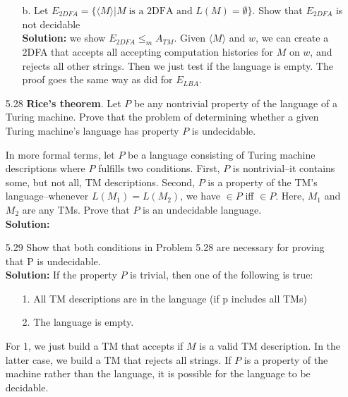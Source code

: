 \begin{enumerate}
\begin{enumerate}
\item[b.]Let $E_{2DFA} = \{\langle M \rangle\vert M\;\text{is a 2DFA and $L(M) = \emptyset$}\}$. Show that $E_{2DFA}$ is not decidable
\\
\textbf{Solution:} we show $E_{2DFA} \le_m A_{TM}$. Given $\langle M \rangle$ and $w$, we can create a 2DFA that accepts all accepting computation histories for $M$ on $w$, and rejects all other strings. Then we just test if the language is empty. The proof goes the same way as did for $E_{LBA}$.
\end{enumerate}

\item[5.28]\textbf{Rice's theorem}. Let $P$ be any nontrivial property of the language of a Turing machine. Prove that the problem of determining whether a given Turing machine's language has property $P$ is undecidable.

\par In more formal terms, let $P$ be a language consisting of Turing machine descriptions where $P$ fulfills two conditions. First, $P$ is nontrivial--it contains some, but not all, TM descriptions. Second, $P$ is a property of the TM's language--whenever $L(M_1) = L(M_2)$, we have  $\in P$ iff  $\in P$. Here, $M_1$ and $M_2$ are any TMs. Prove that $P$ is an undecidable language.
\\
\textbf{Solution:} \alreadyanswered

\item[5.29]Show that both conditions in Problem 5.28 are necessary for proving that P is undecidable.
\\
\textbf{Solution:} If the property $P$ is trivial, then one of the following is true:
\begin{enumerate}
\item[1.]All TM descriptions are in the language (if p includes all TMs)
\item[2.]The language is empty. 
\end{enumerate}
For 1, we just build a TM that accepts if $M$ is a valid TM description. In the latter case, we build a TM that rejects all strings. If $P$ is a property of the machine rather than the language, it is possible for the language to be decidable.


\end{enumerate}
